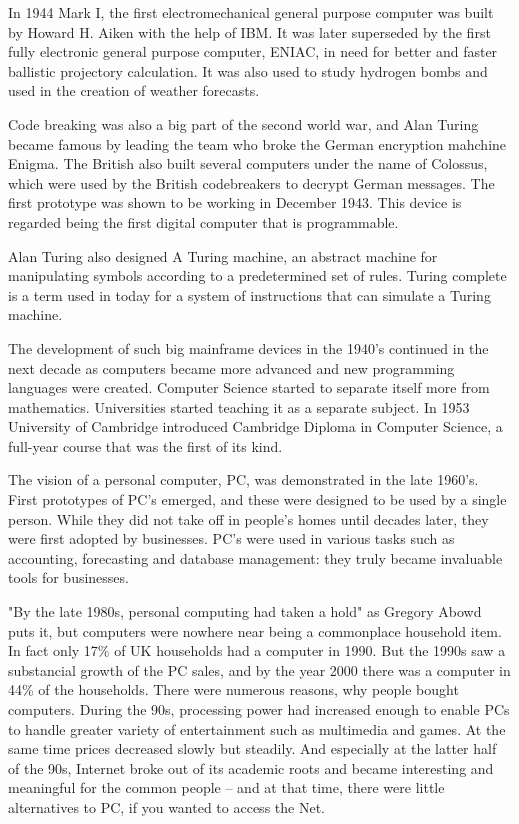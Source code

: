\documentclass[a4paper,12pt]{article}
\begin{document}
In 1944 Mark I, the first electromechanical general purpose computer was built by Howard H. Aiken with the help of IBM. It was later superseded by the first fully electronic general purpose computer, ENIAC, in need for better and faster ballistic projectory calculation. It was also used to study hydrogen bombs and used in the creation of weather forecasts.

Code breaking was also a big part of the second world war, and Alan Turing became famous by leading the team who broke the German encryption mahchine Enigma. The British also built several computers under the name of Colossus, which were used by the British codebreakers to decrypt German messages. The first prototype was shown to be working in December 1943. This device is regarded being the first digital computer that is programmable.

Alan Turing also designed A Turing machine, an abstract machine for manipulating symbols according to a predetermined set of rules. Turing complete is a term used in today for a system of instructions that can simulate a Turing machine.

The development of such big mainframe devices in the 1940's continued in the next decade as computers became more advanced and new programming languages were created. Computer Science started to separate itself more from mathematics. Universities started teaching it as a separate subject. In 1953 University of Cambridge introduced Cambridge Diploma in Computer Science, a full-year course that was the first of its kind.

The vision of a personal computer, PC, was demonstrated in the late 1960's. First prototypes of PC's emerged, and these were designed to be used by a single person. While they did not take off in people's homes until decades later, they were first adopted by businesses. PC's were used in various tasks such as accounting, forecasting and database management: they truly became invaluable tools for businesses.

"By the late 1980s, personal computing had taken a hold" as Gregory Abowd puts it\cite{gda}, but computers were nowhere near being a commonplace household item. In fact only 17\% of UK households had a computer in 1990\cite{stat}. But the 1990s saw a substancial growth of the PC sales, and by the year 2000 there was a computer in 44\% of the households\cite{stat}. There were numerous reasons, why people bought computers. During the 90s, processing power had increased enough to enable PCs to handle greater variety of entertainment such as multimedia and games. At the same time prices decreased slowly but steadily. And especially at the latter half of the 90s, Internet broke out of its academic roots and became interesting and meaningful for the common people -- and at that time, there were little alternatives to PC, if you wanted to access the Net.
\end{document}

